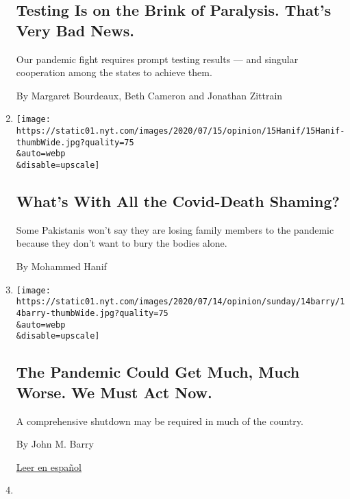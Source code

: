 \begin{enumerate}
  \hypertarget{testing-is-on-the-brink-of-paralysis-thats-very-bad-news}{%
  \subsection{Testing Is on the Brink of Paralysis. That's Very Bad
  News.}\label{testing-is-on-the-brink-of-paralysis-thats-very-bad-news}}

  Our pandemic fight requires prompt testing results --- and singular
  cooperation among the states to achieve them.

  By Margaret Bourdeaux, Beth Cameron and Jonathan Zittrain
\item
  \href{/2020/07/16/opinion/coronavirus-pakistan-death.html}{}

  \texttt{[image: https://static01.nyt.com/images/2020/07/15/opinion/15Hanif/15Hanif-thumbWide.jpg?quality=75\\\&auto=webp\\\&disable=upscale]}

  \hypertarget{whats-with-all-the-covid-death-shaming}{%
  \subsection{What's With All the Covid-Death
  Shaming?}\label{whats-with-all-the-covid-death-shaming}}

  Some Pakistanis won't say they are losing family members to the
  pandemic because they don't want to bury the bodies alone.

  By Mohammed Hanif
\item
  \href{/2020/07/14/opinion/coronavirus-shutdown.html}{}

  \texttt{[image: https://static01.nyt.com/images/2020/07/14/opinion/sunday/14barry/14barry-thumbWide.jpg?quality=75\\\&auto=webp\\\&disable=upscale]}

  \hypertarget{the-pandemic-could-get-much-much-worse-we-must-act-now}{%
  \subsection{The Pandemic Could Get Much, Much Worse. We Must Act
  Now.}\label{the-pandemic-could-get-much-much-worse-we-must-act-now}}

  A comprehensive shutdown may be required in much of the country.

  By John M. Barry

  \href{https://www.nytimes.com/es/2020/07/16/espanol/opinion/coronavirus-cuarentena.html}{Leer
  en español}
\item
  \href{/2020/07/13/opinion/obamacare-aca-trump-women.html}{}


\end{enumerate}
